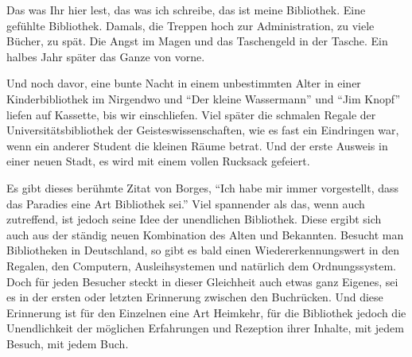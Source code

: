 \documentclass[a4paper,
fontsize=11pt,
oneside,
numbers=noperiodatend,
parskip=half-,
bibliography=totoc,
final
]{scrartcl}
\begin{document}
Das was Ihr hier lest, das was ich schreibe, das ist meine Bibliothek.
Eine gefühlte Bibliothek. Damals, die Treppen hoch zur Administration,
zu viele Bücher, zu spät. Die Angst im Magen und das Taschengeld in der
Tasche. Ein halbes Jahr später das Ganze von vorne.

Und noch davor, eine bunte Nacht in einem unbestimmten Alter in einer
Kinderbibliothek im Nirgendwo und \enquote{Der kleine Wassermann} und
\enquote{Jim Knopf} liefen auf Kassette, bis wir einschliefen. Viel
später die schmalen Regale der Universitätsbibliothek der
Geisteswissenschaften, wie es fast ein Eindringen war, wenn ein anderer
Student die kleinen Räume betrat. Und der erste Ausweis in einer neuen
Stadt, es wird mit einem vollen Rucksack gefeiert.

Es gibt dieses berühmte Zitat von Borges, \enquote{Ich habe mir immer
vorgestellt, dass das Paradies eine Art Bibliothek sei.} Viel spannender
als das, wenn auch zutreffend, ist jedoch seine Idee der unendlichen
Bibliothek. Diese ergibt sich auch aus der ständig neuen Kombination des
Alten und Bekannten. Besucht man Bibliotheken in Deutschland, so gibt es
bald einen Wiedererkennungswert in den Regalen, den Computern,
Ausleihsystemen und natürlich dem Ordnungssystem. Doch für jeden
Besucher steckt in dieser Gleichheit auch etwas ganz Eigenes, sei es in
der ersten oder letzten Erinnerung zwischen den Buchrücken. Und diese
Erinnerung ist für den Einzelnen eine Art Heimkehr, für die Bibliothek
jedoch die Unendlichkeit der möglichen Erfahrungen und Rezeption ihrer
Inhalte, mit jedem Besuch, mit jedem Buch.

\end{document}
